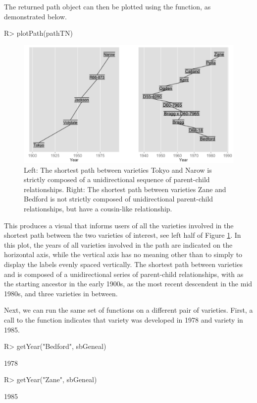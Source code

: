 \documentclass[article,shortnames]{jss}
\begin{document}
The returned path object can then be plotted using the  function, as demonstrated below.

\begin{Code}
R> plotPath(pathTN)
\end{Code}

\begin{figure}[h]
    \centering
    \includegraphics[width=\textwidth]{pathTNZB}
    \caption{Left: The shortest path between varieties Tokyo and Narow is strictly composed of a unidirectional sequence of parent-child relationships. Right: The shortest path between varieties Zane and Bedford is not strictly composed of unidirectional parent-child relationships, but have a cousin-like relationship.}
    \label{fig:pathTNZB}
\end{figure}

This produces a visual that informs users of all the varieties involved in the shortest path between the two varieties of interest, see left half of Figure \ref{fig:pathTNZB}. In this plot, the years of all varieties involved in the path are indicated on the horizontal axis, while the vertical axis has no meaning other than to simply to display the labels evenly spaced vertically. The shortest path between varieties  and  is composed of a unidirectional series of parent-child relationships, with  as the starting ancestor in the early 1900s,  as the most recent descendent in the mid 1980s, and three varieties in between.

Next, we can run the same set of functions on a different pair of varieties. First, a call to the  function  indicates that variety  was developed in 1978 and variety  in 1985.

\begin{CodeChunk}
\begin{CodeInput}
R> getYear("Bedford", sbGeneal)
\end{CodeInput}
\begin{CodeOutput}
[1] 1978
\end{CodeOutput}
\begin{CodeInput}
R> getYear("Zane", sbGeneal)
\end{CodeInput}
\begin{CodeOutput}
[1] 1985
\end{CodeOutput}
\end{CodeChunk}
\end{document}
